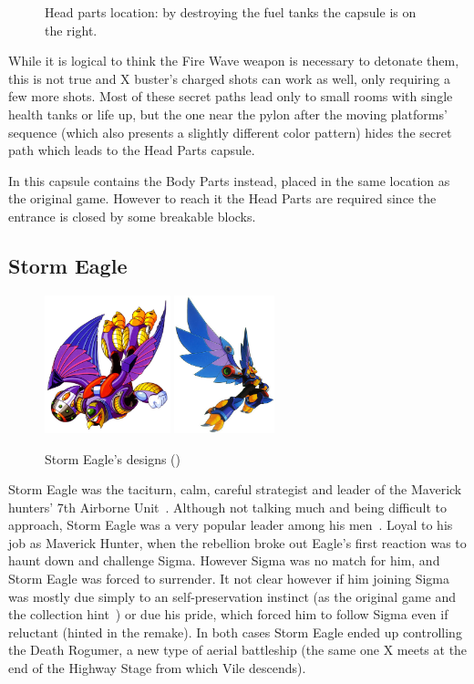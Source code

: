 \begin{figure}[htp]
\begin{subfigure}{0.4\linewidth}
		\caption{}
	\end{subfigure}
	\caption{Head parts location: by destroying the fuel tanks the capsule is on the right.}
\end{figure}While it is logical to think the Fire Wave weapon is necessary to detonate them, this is not true and X buster's charged shots can work as well, only requiring a few more shots. Most of these secret paths lead only to small rooms with single health tanks or life up, but the one near the pylon after the moving platforms' sequence (which also presents a slightly different color pattern) hides the  secret path which leads to the Head Parts capsule. 

In \mhx this capsule contains the Body Parts instead, placed in the same location as the original game. However to reach it the Head Parts are required since the entrance is closed by some breakable blocks.

\subsection{Storm Eagle}\label{boss:Storm_Eagle}
\begin{figure}[htp]
	\centering
	\includegraphics[height=4cm]{figures/X1/Storm_eagle/Storm_Eagle.jpg}
	\includegraphics[height=4cm]{figures/X1/Storm_eagle/MHXStormEagle.jpg}
	\caption{Storm Eagle's designs (\cite{book:MMX_Complete_art})}
\end{figure}
Storm Eagle was the taciturn, calm, careful strategist and leader of the Maverick hunters' 7th Airborne Unit~\cite{wiki:Storm_eagle}. Although not talking much and being difficult to approach, Storm Eagle was a very popular leader among his men~\cite{MHX:manual}. Loyal to his job as Maverick Hunter, when the rebellion broke out Eagle's first reaction was to haunt down and challenge Sigma. However Sigma was no match for him, and Storm Eagle was forced to surrender. It not clear however if him joining Sigma was mostly due simply to an self-preservation instinct (as the original game and the collection hint~\cite{Xcoll1:Manual_X1}) or due his pride, which forced him to follow Sigma even if reluctant (hinted in the remake). In both cases Storm Eagle ended up controlling the Death Rogumer, a new type of aerial battleship (the same one X meets at the end of the Highway Stage from which Vile descends).

